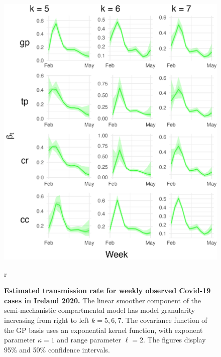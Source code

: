 \documentclass[
11pt, %
oneside, %
english, %
singlespacing, %
]{macthesis} %
\begin{document}
\begin{figure}[H]
\centering
\includegraphics[width=\textwidth, height = \textwidth]{figure/Ireland/Ireland_agg_k(5,6,7)_bsd1_beta1_gamma6_sd01_plot_beta.png}
\caption[Estimated Covid-19 Transmission Rate (2020)]{\textbf{Estimated transmission rate for weekly observed Covid-19 cases in Ireland 2020.} The linear smoother component of the semi-mechanistic compartmental model has model granularity increasing from right to left \(k= 5,6,7\). The covariance function of the GP basis uses an exponential kernel function, with exponent parameter \(\kappa = 1\) and range parameter \(\ell = 2\). The figures display 95\% and 50\% confidence intervals.}
\label{fig:ireland_trans}r
\end{figure}
\end{document}
